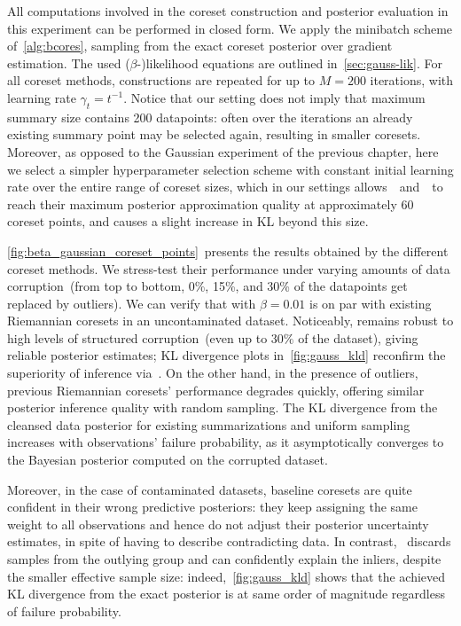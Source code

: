 All computations involved in the coreset construction and posterior evaluation in this experiment can be performed in closed form. We apply the minibatch scheme of~\cref{alg:bcores}, sampling from the exact coreset posterior over gradient estimation. The used \mbox{($\beta$-)}likelihood equations are outlined in~\cref{sec:gauss-lik}. For all coreset methods, constructions are repeated for up to $M=200$ iterations, with learning rate $\gamma_t = t^{-1}$. Notice that our setting does not imply that maximum summary size contains 200 datapoints: often over the iterations an already existing summary point may be selected again, resulting in smaller coresets. Moreover, as opposed to the Gaussian experiment of the previous chapter, here we select a simpler hyperparameter selection scheme with constant initial learning rate over the entire range of coreset sizes, which in our settings allows~\sparsevi~and~\bcores~to reach their maximum posterior approximation quality at approximately 60 coreset points, and causes a slight increase in KL beyond this size.

\cref{fig:beta_gaussian_coreset_points}~presents the results obtained by the different coreset methods. We stress-test their performance under varying amounts of data corruption~(from top to bottom, 0\%, 15\%, and 30\% of the datapoints get replaced by outliers). We can verify that \bcores{} with $\beta=0.01$ is on par with existing Riemannian coresets in an uncontaminated dataset. Noticeably, \bcores{} remains robust to high levels of structured corruption~(even up to $30\%$ of the dataset), giving reliable posterior estimates; KL divergence plots in~\cref{fig:gauss_kld} reconfirm the superiority of inference via~\bcores{}. On the other hand, in the presence of outliers, previous Riemannian coresets' performance degrades quickly, offering similar posterior inference quality with random sampling. The KL divergence from the cleansed data posterior for existing summarizations and uniform sampling increases with observations' failure probability, as it asymptotically converges to the Bayesian posterior computed on the corrupted dataset. 


Moreover, in the case of contaminated datasets, baseline coresets are quite confident in their wrong predictive posteriors: they keep assigning the same weight to all observations and hence do not adjust their posterior uncertainty estimates, in spite of having to describe contradicting data. In contrast,~\bcores{} discards samples from the outlying group and can confidently explain the inliers, despite the smaller effective sample size: indeed,~\cref{fig:gauss_kld} shows that the achieved KL divergence from the exact posterior is at same order of magnitude regardless of failure probability. 

